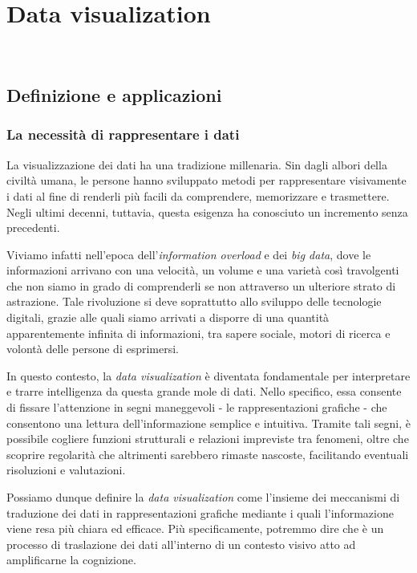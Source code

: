 \chapter{Data visualization}
\label{cap:studio_data_viz}
\\

\section{Definizione e applicazioni}
\subsection{La necessità di rappresentare i dati}
La visualizzazione dei dati ha una tradizione millenaria. Sin dagli albori della civiltà umana, 
le persone hanno sviluppato metodi per rappresentare visivamente i dati al fine di renderli più facili da comprendere, 
memorizzare e trasmettere.
Negli ultimi decenni, tuttavia, questa esigenza ha conosciuto un incremento senza precedenti.

Viviamo infatti nell'epoca dell'\emph{information overload} e dei \emph{big data}, dove le informazioni
arrivano con una velocità, un volume e una varietà così travolgenti che non siamo in grado di comprenderli se non attraverso
un ulteriore strato di astrazione.
Tale rivoluzione si deve soprattutto allo sviluppo delle tecnologie digitali, grazie alle quali siamo arrivati a disporre di una quantità 
apparentemente infinita di informazioni, tra sapere sociale, motori di ricerca e volontà delle persone di esprimersi.

In questo contesto, la \emph{data visualization} è diventata fondamentale per interpretare e trarre intelligenza da questa grande mole di dati.
Nello specifico, essa consente di fissare l'attenzione in segni maneggevoli - le rappresentazioni grafiche - che consentono una lettura dell'informazione
semplice e intuitiva. Tramite tali segni, è possibile cogliere funzioni strutturali e relazioni impreviste tra fenomeni, oltre che scoprire regolarità che 
altrimenti sarebbero rimaste nascoste, facilitando eventuali risoluzioni e valutazioni.

\bigskip
\noindent Possiamo dunque definire la \emph{data visualization} come l'insieme dei meccanismi di traduzione dei dati in rappresentazioni grafiche
mediante i quali l'informazione viene resa più chiara ed efficace. Più specificamente, 
potremmo dire che è un processo di traslazione dei dati all'interno di un contesto visivo atto ad amplificarne la cognizione.


